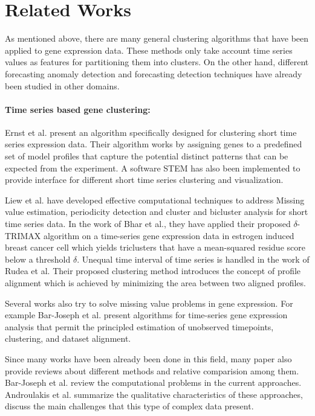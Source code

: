 \section{Related Works}
\label{sec-related}
As mentioned above, there are many general clustering
algorithms that have been applied to gene expression data. These methods only take account time series values as features for partitioning them into clusters. On the other hand, different forecasting anomaly detection and forecasting detection techniques have already been studied in other domains.

\paragraph{\textbf{Time series based gene clustering:}} 
Ernst et al.\cite{short_time} present an algorithm specifically designed for
clustering short time series expression data. Their algorithm
works by assigning genes to a predefined set of model profiles that capture the potential distinct patterns that can be
expected from the experiment. A software STEM\cite{STEM} has also been implemented to provide interface for different short time series clustering and visualization. 

Liew et al.\cite{period} have
developed effective computational techniques to address
Missing value estimation,  periodicity detection
and  cluster and bicluster analysis for short time series data. In the work of Bhar et al.\cite{Coexp}, they have applied their proposed $\delta$-TRIMAX
algorithm on a time-series gene expression data in estrogen induced breast cancer cell which  yields
triclusters that have a mean-squared residue score below a threshold $\delta$. Unequal time interval of time series is handled in the work of Rudea et al\cite{Unequal}. Their proposed clustering method introduces the concept of
profile alignment which is achieved by minimizing the area between two aligned
profiles.

Several works also try to solve missing value problems in gene expression. For example
Bar-Joseph et al.\cite{new approach} present algorithms for time-series gene expression analysis that permit the principled estimation of unobserved timepoints, clustering, and dataset alignment.

Since many works have been already been done in this field, many paper also provide reviews about different methods and relative comparision among them. Bar-Joseph et al.\cite{Bar_Josep} review the computational problems in the current approaches. Androulakis et al.\cite{review paper}  summarize the qualitative characteristics of these approaches, discuss the main challenges that this
type of complex data present.

